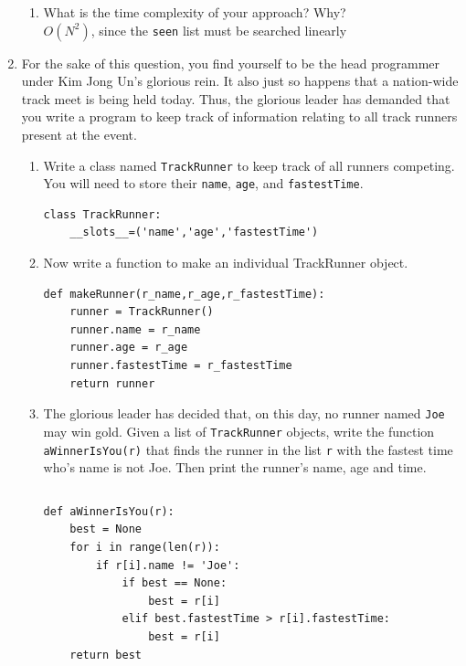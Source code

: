 \documentclass[11pt]{article}
\newenvironment{answer}{\large\lstset{basicstyle=\tiny}\color{white}}{}
\newenvironment{answer}{\large\lstset{basicstyle=\large}\color{red}}{}
\begin{document}
\begin{enumerate}
\begin{enumerate}
\item
What is the time complexity of your approach?
Why? \\

\begin{answer}
$O(N^2)$, since the \texttt{seen} list must be searched linearly
\end{answer}
\end{enumerate}

\newpage
\item For the sake of this question, you find yourself to be the head programmer under Kim Jong Un's glorious rein.
It also just so happens that a nation-wide track meet is being held today. Thus, the glorious leader has demanded that
you write a program to keep track of information relating to all track runners present at the event.

\begin{enumerate}
\item Write a class named \texttt{TrackRunner} to keep track of all runners competing.
You will need to store their \texttt{name}, \texttt{age}, and \texttt{fastestTime}.
\begin{answer}
\begin{lstlisting}
class TrackRunner:
    __slots__=('name','age','fastestTime')

\end{lstlisting}
\end{answer}

\item Now write a function to make an individual TrackRunner object.
\begin{answer}
\begin{lstlisting}
def makeRunner(r_name,r_age,r_fastestTime):
    runner = TrackRunner()
    runner.name = r_name
    runner.age = r_age
    runner.fastestTime = r_fastestTime
    return runner
\end{lstlisting}
\end{answer}

\item The glorious leader has decided that, on this day, no runner named \texttt{Joe} may win
gold. Given a list of \texttt{TrackRunner} objects, write the function \texttt{aWinnerIsYou(r)} that finds the runner in the list \texttt{r} with the fastest time who's name is not Joe. 
Then print the runner's name, age and time.
\begin{lstlisting}

\end{lstlisting}
\begin{answer}
\begin{lstlisting}
def aWinnerIsYou(r):
    best = None
    for i in range(len(r)):
        if r[i].name != 'Joe':
            if best == None:
                best = r[i]
            elif best.fastestTime > r[i].fastestTime:
                best = r[i]
    return best


\end{lstlisting}
\end{answer}
\end{enumerate}
\end{enumerate}
\end{document}
